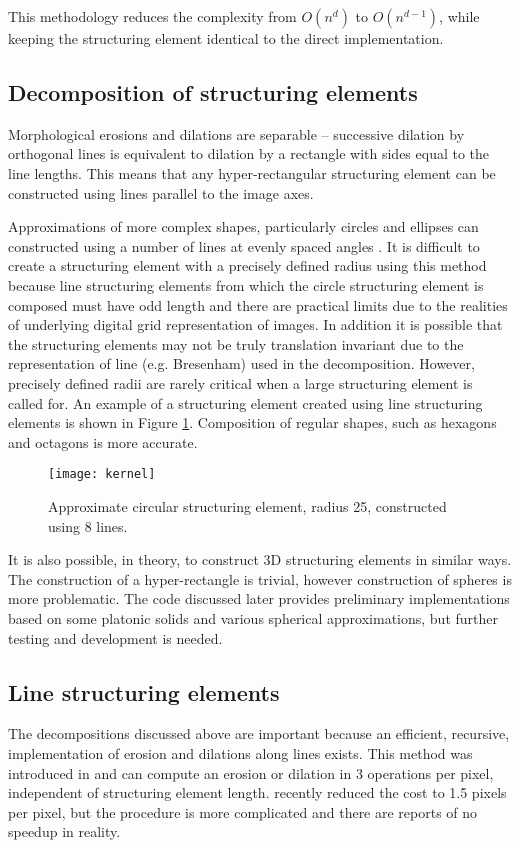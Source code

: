 \documentclass{InsightArticle}
\begin{document}
This methodology reduces the complexity from $O(n^d)$ to $O(n^{d-1})$,
while keeping the structuring element identical to the direct
implementation.

\subsection{Decomposition of structuring elements}
\label{sect:MMdecomp}
Morphological erosions and dilations are separable -- successive
dilation by orthogonal lines is equivalent to dilation by a rectangle
with sides equal to the line lengths. This means that any
hyper-rectangular structuring element can be constructed using lines
parallel to the image axes.

Approximations of more complex shapes, particularly circles and
ellipses can constructed using a number of lines at evenly spaced
angles \cite{Adams93}. It is difficult to create a structuring element
with a precisely defined radius using this method because line
structuring elements from which the circle structuring element is
composed must have odd length and there are practical limits due to
the realities of underlying digital grid representation of images. In
addition it is possible that the structuring elements may not be truly
translation invariant due to the representation of line
(e.g. Bresenham) used in the decomposition. However, precisely defined
radii are rarely critical when a large structuring element is called
for. An example of a structuring element created using line
structuring elements is shown in Figure
\ref{fig:circledecomposition}. Composition of regular shapes, such as
hexagons and octagons is more accurate.

\begin{figure}[htbp]
\centering
\texttt{[image: kernel]}
\caption{Approximate circular structuring element, radius 25, constructed using 8 lines.\label{fig:circledecomposition}}
\end{figure}

It is also possible, in theory, to construct 3D structuring elements
in similar ways. The construction of a hyper-rectangle is trivial,
however construction of spheres is more problematic. The code
discussed later provides preliminary implementations based on some
platonic solids and various spherical approximations, but further
testing and development is needed.

\subsection{Line structuring elements}
The decompositions discussed above are important because an efficient,
recursive, implementation of erosion and dilations along lines
exists. This method was introduced in \cite{Gil1993,vanHerk1992a} and
can compute an erosion or dilation in 3 operations per pixel,
independent of structuring element length. \cite{Gil2000} recently
reduced the cost to 1.5 pixels per pixel, but the procedure is more
complicated and there are reports of no speedup in reality.
\end{document}
